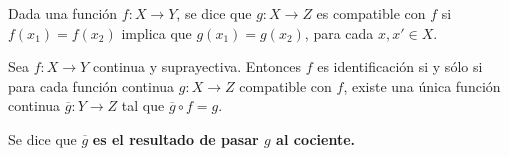 

\begin{definition}
Dada una función $f : X \longrightarrow Y$, se dice que $g : X \longrightarrow Z$ es compatible con $f$ si $f(x_1) = f(x_2)$ implica que $g(x_1) = g(x_2)$, para cada $x, x' \in X$. 
\end{definition}

\begin{theorem}
Sea $f : X \longrightarrow Y$ continua y suprayectiva. Entonces $f$ es identificación si y sólo si para cada función continua $g : X \longrightarrow Z$ compatible con $f$, existe una única función continua $\overline{g} : Y \longrightarrow Z$ tal que $\overline{g} \circ f = g$.
\bigskip

\bigskip

Se dice que $\overline{g}$ \textbf{es el resultado de pasar $g$ al cociente.}

\end{theorem}

